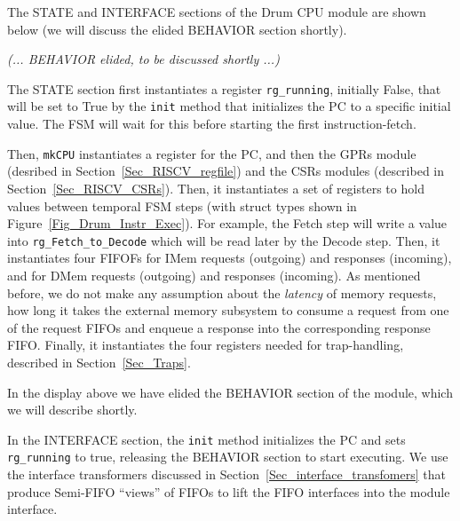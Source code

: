 \label{Sec_Drum_CPU_module}


The STATE and INTERFACE sections of the Drum CPU module are shown
below (we will discuss the elided BEHAVIOR section shortly).



\hm \emph{(... BEHAVIOR elided, to be discussed shortly ...)}



The STATE section first instantiates a register \verb|rg_running|,
initially False, that will be set to True by the \verb|init| method
that initializes the PC to a specific initial value.  The FSM will
wait for this before starting the first instruction-fetch.

Then, \verb|mkCPU| instantiates a register for the PC, and then the
GPRs module (desribed in Section~\ref{Sec_RISCV_regfile}) and the CSRs
modules (described in Section~\ref{Sec_RISCV_CSRs}).  Then, it
instantiates a set of registers to hold values between temporal FSM
steps (with struct types shown in Figure~\ref{Fig_Drum_Instr_Exec}).
For example, the Fetch step will write a value into
\verb|rg_Fetch_to_Decode| which will be read later by the Decode step.
Then, it instantiates four FIFOFs for IMem requests (outgoing) and
responses (incoming), and for DMem requests (outgoing) and responses
(incoming). As mentioned before, we do not make any assumption about
the \emph{latency} of memory requests, {\ie} how long it takes the
external memory subsystem to consume a request from one of the request
FIFOs and enqueue a response into the corresponding response FIFO.
Finally, it instantiates the four registers needed for trap-handling,
described in Section~\ref{Sec_Traps}.

In the display above we have elided the BEHAVIOR section of the
module, which we will describe shortly.

In the INTERFACE section, the \verb|init| method initializes the PC
and sets \verb|rg_running| to true, releasing the BEHAVIOR section to
start executing.  We use the interface transformers discussed in
Section~\ref{Sec_interface_transfomers} that produce Semi-FIFO
``views'' of FIFOs to lift the FIFO interfaces into the module
interface.


